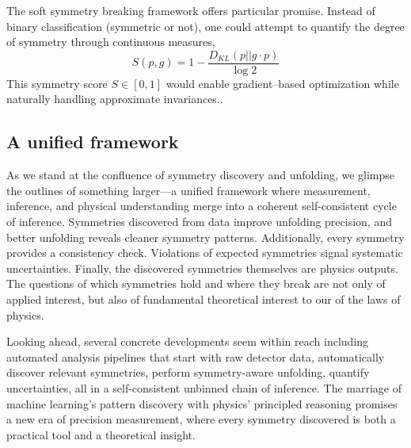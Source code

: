         The soft symmetry breaking framework offers particular promise.
        Instead of binary classification (symmetric or not), one could attempt to quantify the degree of symmetry through continuous measures,
        \[
            S(p, g) = 1 - \frac{D_{KL}(p || g \cdot p)}{\log 2}
        \]
        This symmetry score \(S \in [0,1]\) would enable gradient--based optimization while naturally handling approximate invariances..
    
    \subsection{A unified framework}
        As we stand at the confluence of symmetry discovery and unfolding, we glimpse the outlines of something larger—a unified framework where measurement, inference, and physical understanding merge into a coherent self-consistent cycle of inference.
        Symmetries discovered from data improve unfolding precision, and better unfolding reveals cleaner symmetry patterns.
        Additionally, every symmetry provides a consistency check.
        Violations of expected symmetries signal systematic uncertainties.
        Finally, the discovered symmetries themselves are physics outputs.
        The questions of which symmetries hold and where they break are not only of applied interest, but also of fundamental theoretical interest to our of the laws of physics.
    
        Looking ahead, several concrete developments seem within reach including automated analysis pipelines that start with raw detector data, automatically discover relevant symmetries, perform symmetry-aware unfolding, quantify uncertainties, all in a self-consistent unbinned chain of inference.
        The marriage of machine learning's pattern discovery with physics' principled reasoning promises a new era of precision measurement, where every symmetry discovered is both a practical tool and a theoretical insight.
